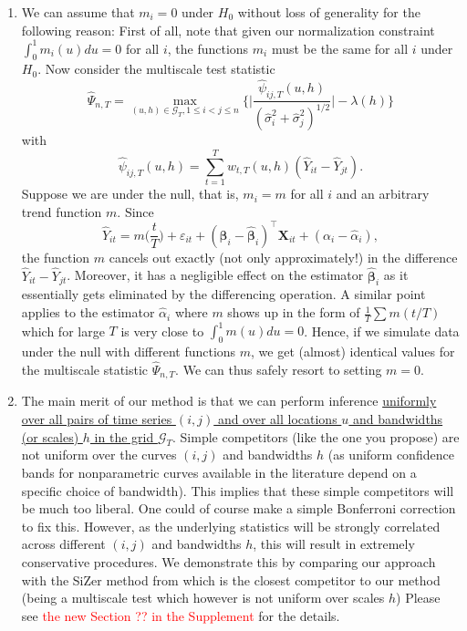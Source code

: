 \documentclass[a4paper,12pt]{article}
\begin{document}
\begin{enumerate}[label=\arabic*.,leftmargin=0.6cm]
\begin{enumerate}[label=(\roman*),leftmargin=0.75cm,topsep=0pt]
\item We can assume that $m_i=0$ under $H_0$ without loss of generality for the following reason: First of all, note that given our normalization constraint $\int_0^1 m_i(u)du = 0$ for all $i$, the functions $m_i$ must be the same for all $i$ under $H_0$. Now consider the multiscale test statistic 
\[ \widehat{\Psi}_{n,T} = \max_{(u,h) \in \mathcal{G}_T, 1 \le i < j \le n} \Big\{ \Big| \frac{\widehat{\psi}_{ij,T}(u,h)}{(\widehat{\sigma}_i^2 + \widehat{\sigma}_j^2)^{1/2}} \Big| - \lambda(h) \Big\} \]
with
\[ \widehat{\psi}_{ij,T}(u,h) = \sum_{t=1}^T w_{t,T}(u,h) (\widehat{Y}_{it} - \widehat{Y}_{jt}). \]
Suppose we are under the null, that is, $m_i = m$ for all $i$ and an arbitrary trend function $m$. Since
\[ \widehat{Y}_{it} = m\Big(\frac{t}{T}\Big) + \varepsilon_{it} + (\boldsymbol{\beta}_i - \widehat{\boldsymbol{\beta}}_i)^\top \boldsymbol{X}_{it} + (\alpha_i - \widehat{\alpha}_i), \]
the function $m$ cancels out exactly (not only approximately!) in the difference $\widehat{Y}_{it} - \widehat{Y}_{jt}$. Moreover, it has a negligible effect on the estimator $\widehat{\boldsymbol{\beta}}_i$ as it essentially gets eliminated by the differencing operation. A similar point applies to the estimator $\widehat{\alpha}_i$ where $m$ shows up in the form of $\frac{1}{T} \sum m(t/T)$ which for large $T$ is very close to $\int_0^1 m(u) du = 0$. Hence, if we simulate data under the null with different functions $m$, we get (almost) identical values for the multiscale statistic $\widehat{\Psi}_{n,T}$. We can thus safely resort to setting $m=0$. 

\item %
The main merit of our method is that we can perform inference \uline{uniformly over all pairs of time series $(i,j)$ and over all locations $u$ and bandwidths (or scales) $h$ in the grid $\mathcal{G}_T$}. Simple competitors (like the one you propose) are not uniform over the curves $(i,j)$ and bandwidths $h$ (as uniform confidence bands for nonparametric curves available in the literature depend on a specific choice of bandwidth). This implies that these simple competitors will be much too liberal. One could of course make a simple Bonferroni correction to fix this. However, as the underlying statistics will be strongly correlated across different $(i,j)$ and bandwidths $h$, this will result in extremely conservative procedures. We demonstrate this by comparing our approach with the SiZer method from \cite{Park2009} which is the closest competitor to our method (being a multiscale test which however is not uniform over scales $h$) Please see \textcolor{red}{the new Section ?? in the Supplement} for the details. 


\end{enumerate}
\end{enumerate}
\end{document}
